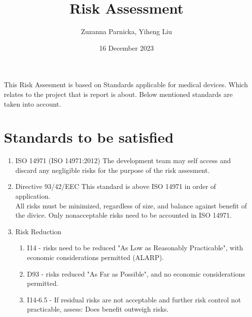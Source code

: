 \documentclass{article}[10pt]
\title{Risk Assessment}
\author{Zuzanna Parnicka, Yiheng Liu}
\date{16 December 2023}
\begin{document}
\maketitle
This Risk Assesment is based on Standards applicable for medical devices. Which relates to the project that is report is about.
Below mentioned standards are taken into account.
\section{Standards to be satisfied}
\begin{enumerate}
    \item ISO 14971 (ISO 14971:2012)
    The development team may self access and discard any negligible risks for the purpose of the risk assesment.
    \item Directive 93/42/EEC
    This standard is above ISO 14971 in order of application.\\
    All risks must be minimized, regardless of size, and balance against benefit of the divice. Only nonacceptable risks need to be accounted in ISO 14971.
    \item Risk Reduction
    \begin{enumerate}
        \item I14 - risks need to be reduced "As Low as Reasonably Practicable", with economic considerations permitted (ALARP).
        \item D93 - risks reduced "As Far as Possible", and no economic considerations permitted.
        \item I14-6.5 - If residual risks are not acceptable and further risk control not practicable, assess: Does benefit outweigh risks.
    \end{enumerate}
\end{enumerate}
\end{document}

